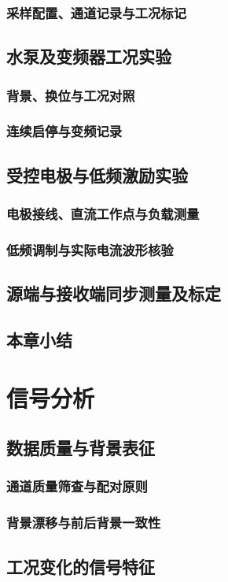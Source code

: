 \subsection{采样配置、通道记录与工况标记}
\section{水泵及变频器工况实验}
\subsection{背景、换位与工况对照}
\subsection{连续启停与变频记录}
\section{受控电极与低频激励实验}
\subsection{电极接线、直流工作点与负载测量}
\subsection{低频调制与实际电流波形核验}
\section{源端与接收端同步测量及标定}
\section{本章小结}

\chapter{信号分析}
\section{数据质量与背景表征}
\subsection{通道质量筛查与配对原则}
\subsection{背景漂移与前后背景一致性}
\section{工况变化的信号特征}
